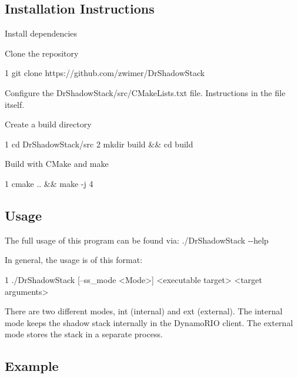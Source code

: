 \subsection*{Installation Instructions}


\begin{DoxyEnumerate}
\item Install dependencies
\item Clone the repository 
\begin{DoxyCode}
1 git clone https://github.com/zwimer/DrShadowStack
\end{DoxyCode}

\item Configure the {\ttfamily Dr\+Shadow\+Stack/src/\+C\+Make\+Lists.\+txt} file. Instructions in the file itself.
\item Create a build directory 
\begin{DoxyCode}
1 cd DrShadowStack/src
2 mkdir build && cd build
\end{DoxyCode}

\item Build with C\+Make and make 
\begin{DoxyCode}
1 cmake .. && make -j 4
\end{DoxyCode}

\end{DoxyEnumerate}

\subsection*{Usage}

The full usage of this program can be found via\+: {\ttfamily ./\+Dr\+Shadow\+Stack -\/-\/help}

In general, the usage is of this format\+: 
\begin{DoxyCode}
1 ./DrShadowStack [--ss\_mode <Mode>] <executable target> <target arguments>
\end{DoxyCode}


There are two different modes, {\ttfamily int} (internal) and {\ttfamily ext} (external). The internal mode keeps the shadow stack internally in the Dynamo\+R\+IO client. The external mode stores the stack in a separate process.

\subsection*{Example}

